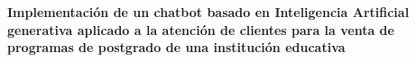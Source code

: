 \documentclass[10pt,a4paper]{article}
\begin{document}
	\begin{center}
		{\Large \textbf{Implementación de un chatbot basado en Inteligencia Artificial generativa aplicado a la atención de clientes para la venta de programas de postgrado de una institución educativa}}\\
		\vspace{2mm}
	\end{center}		
	
\end{document}
